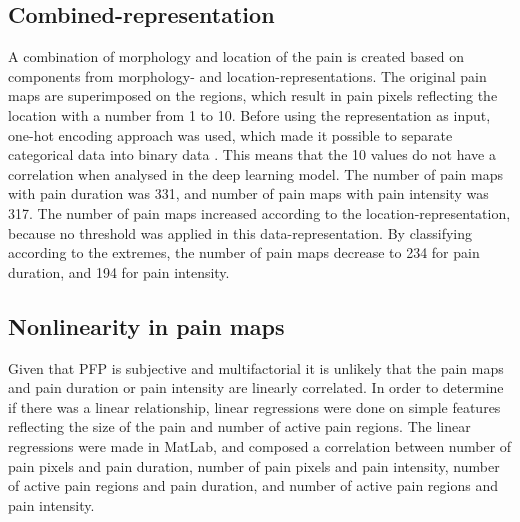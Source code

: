 \subsection*{\textbf{Combined-representation}} 
A combination of morphology and location of the pain is created based on components from morphology- and location-representations. The original pain maps are superimposed on the regions, which result in pain pixels reflecting the location with a number from 1 to 10. Before using the representation as input, one-hot encoding approach was used, which made it possible to separate categorical data into binary data \citep{Harris2012}. This means that the 10 values do not have a correlation when analysed in the deep learning model. The number of pain maps with pain duration was 331, and number of pain maps with pain intensity was 317. The number of pain maps increased according to the location-representation, because no threshold was applied in this data-representation. By classifying according to the extremes, the number of pain maps decrease to 234 for pain duration, and 194 for pain intensity.

\subsection*{\textbf{Nonlinearity in pain maps}} 
Given that PFP is subjective and multifactorial it is unlikely that the pain maps and pain duration or pain intensity are linearly correlated. In order to determine if there was a linear relationship, linear regressions were done on simple features reflecting the size of the pain and number of active pain regions. The linear regressions were made in MatLab, and composed a correlation between number of pain pixels and pain duration, number of pain pixels and pain intensity, number of active pain regions and pain duration, and number of active pain regions and pain intensity.

